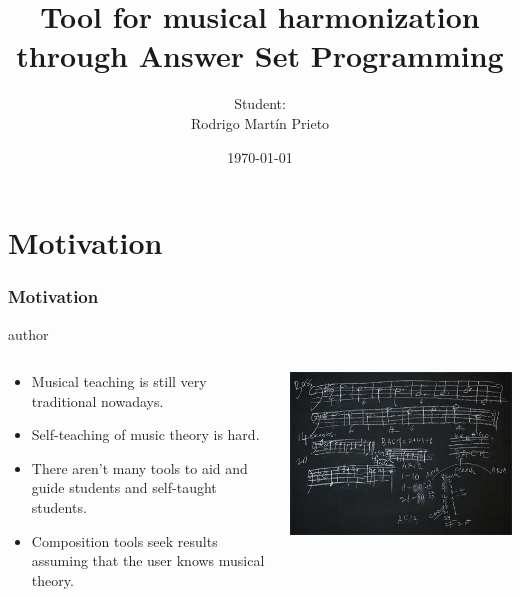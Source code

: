 \documentclass[english]{beamer}
\title[haspie]{Tool for musical harmonization\\through Answer Set Programming}
\author[Rodrigo Martín Prieto]{Student:\\Rodrigo Martín Prieto}
\institute[UDC] {
Universidade da Coruña \\ %
\medskip
\textit{r.martin@udc.es} %
}
\date{\today} %
\begin{document}
\begin{frame}
\titlepage %
\end{frame}


\section{Motivation}
\begin{frame}
	\frametitle{Motivation}
			\begin{beamercolorbox}[leftskip=8cm,center,wd=0.7\textwidth]{author}
			\begin{columns}[T]
			\begin{column}{.60\textwidth}%
				\begin{itemize}
						\item Musical teaching is still very traditional nowadays.
						\item Self-teaching of music theory is hard.
						\item There aren't many tools to aid and guide students and self-taught students.
						\item Composition tools seek results assuming that the user knows musical theory.
				\end{itemize}
			\end{column}
			\begin{column}{.39\textwidth}%
			\includegraphics[width=\linewidth]{imagenes/music_theory.jpg}
			\end{column}
			\end{columns}
			\end{beamercolorbox}

\end{frame}
\end{document}
